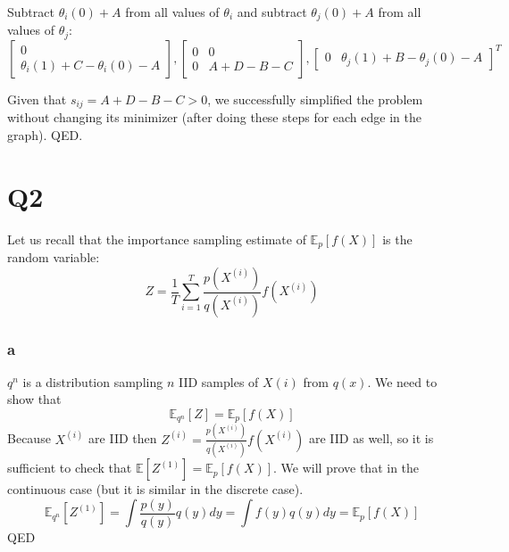 \documentclass[11pt]{article}
\begin{document}
	Subtract $\theta_{i}(0) + A$ from all values of $\theta_{i}$ and subtract  $\theta_{j}(0) + A$ from all values of $\theta_{j}$:
\begin{equation}
\begin{bmatrix}
0 \\ \theta_{i}(1) + C - \theta_{i}(0) - A
\end{bmatrix},
\begin{bmatrix}
0 & 0 \\
0 & A + D - B - C
\end{bmatrix},
\begin{bmatrix}
0 & \theta_{j}(1) + B - \theta_{j}(0) - A
\end{bmatrix}^T
\end{equation}

Given that $s_{ij} = A + D - B - C > 0$, we successfully simplified the problem without changing its minimizer (after doing these steps for each edge in the graph).
QED.

\part*{Q2}
Let us recall that the importance sampling estimate of $\mathds{E}_p[f(X)]$ is the random variable:
\begin{equation}\label{eq:q2_IS}
	Z=\frac{1}{T}\sum_{i=1}^{T}\frac{p(X^{(i)})}{q(X^{(i)})}f(X^{(i)})
\end{equation}
\section*{a}
$q^n$ is a distribution sampling $n$ IID samples of $X{(i)}$ from $q(x)$. We need to show that 
\begin{equation}\label{eq:q2_proof}
	\mathds{E}_{q^n}[Z] = \mathds{E}_p[f(X)]
\end{equation}
Because $X^{(i)}$ are IID then $Z^{(i)}=\frac{p(X^{(i)})}{q(X^{(i)})}f(X^{(i)})$ are IID as well, so it is sufficient to check that $\mathds{E}\left[Z^{(1)}\right] = \mathds{E}_p[f(X)]$. We will prove that in the continuous case (but it is similar in the discrete case).
\begin{equation*}
	\mathds{E}_{q^n}[Z^{(1)}] = \int \frac{p(y)}{q(y)}q(y)dy = \int f(y)q(y)dy=\mathds{E}_p[f(X)]
\end{equation*}
QED
\end{document}
